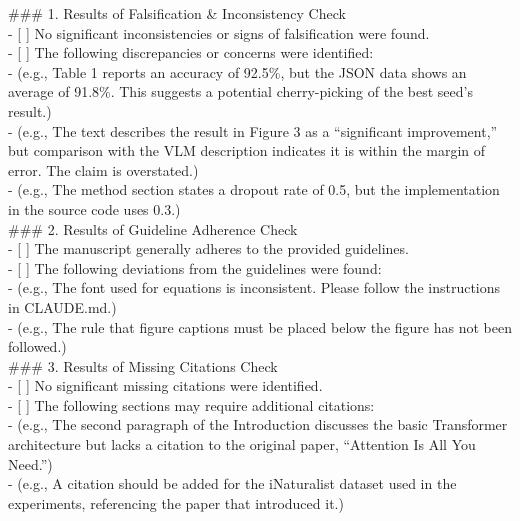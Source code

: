 \begin{tcolorbox}[colback=gray!10, colframe=gray!40!black, breakable=true, title=Prompt for Feedback Generation]
\#\#\# 1. Results of Falsification \& Inconsistency Check\\
- [ ] No significant inconsistencies or signs of falsification were found.\\
- [ ] The following discrepancies or concerns were identified:\\
    - (e.g., Table 1 reports an accuracy of 92.5\%, but the JSON data shows an average of 91.8\%. This suggests a potential cherry-picking of the best seed's result.)\\
    - (e.g., The text describes the result in Figure 3 as a ``significant improvement,'' but comparison with the VLM description indicates it is within the margin of error. The claim is overstated.)\\
    - (e.g., The method section states a dropout rate of 0.5, but the implementation in the source code uses 0.3.)\\

\#\#\# 2. Results of Guideline Adherence Check\\
- [ ] The manuscript generally adheres to the provided guidelines.\\
- [ ] The following deviations from the guidelines were found:\\
    - (e.g., The font used for equations is inconsistent. Please follow the instructions in CLAUDE.md.)\\
    - (e.g., The rule that figure captions must be placed below the figure has not been followed.)\\

\#\#\# 3. Results of Missing Citations Check\\
- [ ] No significant missing citations were identified.\\
- [ ] The following sections may require additional citations:\\
    - (e.g., The second paragraph of the Introduction discusses the basic Transformer architecture but lacks a citation to the original paper, ``Attention Is All You Need.'')\\
    - (e.g., A citation should be added for the iNaturalist dataset used in the experiments, referencing the paper that introduced it.)\\


\end{tcolorbox}
